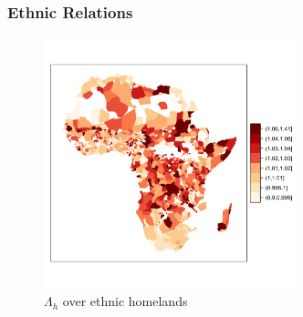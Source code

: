 \documentclass[]{beamer}   	%
\begin{document}
\begin{frame}
\frametitle{Ethnic Relations}
\begin{figure}
\centering
\includegraphics[width=0.65\textwidth,trim={1cm 4cm 0cm 4.5cm},clip]{../../Analysis/output/other_maps/ethnicity_zeta.png}
\caption{$\Lambda_{h}$ over ethnic homelands}
\label{fig:ethnicities}
\end{figure}
\end{frame}
\end{document}
